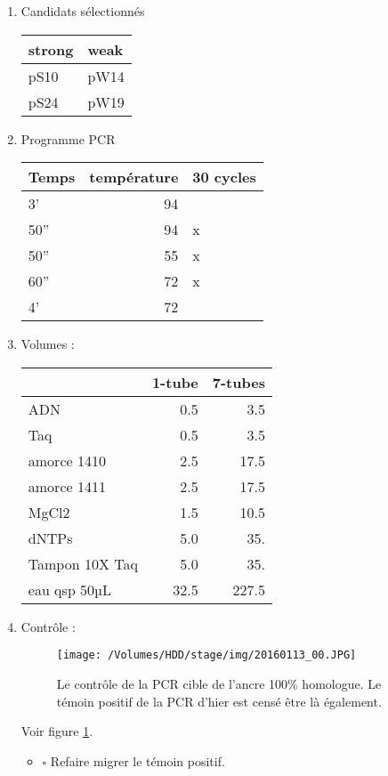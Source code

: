 \documentclass[9pt, oneside, twocolumn]{scrartcl}
\begin{document}
\begin{enumerate}
\item Candidats sélectionnés
\label{sec:orgheadline11}
\begin{center}
\begin{tabular}{ll}
\toprule
strong & weak\\
\midrule
pS10 & pW14\\
pS24 & pW19\\
\bottomrule
\end{tabular}
\end{center}

\item Programme PCR
\label{sec:orgheadline12}
\begin{center}
\begin{tabular}{lrl}
\toprule
Temps & température & 30 cycles\\
\midrule
3' & 94 & \\
50'' & 94 & x\\
50'' & 55 & x\\
60'' & 72 & x\\
4' & 72 & \\
\bottomrule
\end{tabular}
\end{center}

\item Volumes :
\label{sec:orgheadline13}
\begin{center}
\begin{tabular}{lrr}
\toprule
 & 1-tube & 7-tubes\\
\midrule
ADN & 0.5 & 3.5\\
Taq & 0.5 & 3.5\\
amorce 1410 & 2.5 & 17.5\\
amorce 1411 & 2.5 & 17.5\\
MgCl2 & 1.5 & 10.5\\
dNTPs & 5.0 & 35.\\
Tampon 10X Taq & 5.0 & 35.\\
\midrule
eau qsp 50µL & 32.5 & 227.5\\
\bottomrule
\end{tabular}
\end{center}

\item Contrôle :
\label{sec:orgheadline14}

\begin{figure}[htb]
\centering
\texttt{[image: /Volumes/HDD/stage/img/20160113\_00.JPG]}
\caption{\label{fig:orgparagraph1}
Le contrôle de la PCR cible de l'ancre 100\% homologue. Le témoin positif de la PCR d'hier est censé être là également. }
\end{figure}

Voir figure \ref{fig:orgparagraph1}. 

\begin{itemize}
\item $\square$ Refaire migrer le témoin positif.
\end{itemize}
\end{enumerate}
\end{document}
